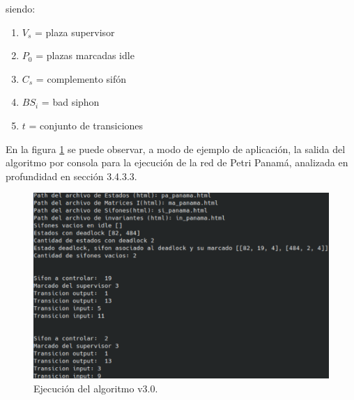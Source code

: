 \noindent siendo:
\begin{enumerate}
    \item $V_s$ = plaza supervisor
    \item $P_0$ = plazas marcadas idle
    \item $C_s$ = complemento sifón
    \item $BS_i$ = bad siphon
    \item $t$ = conjunto de transiciones
\end{enumerate}

En la figura \ref{fig:fig3.9} se puede observar, a modo de ejemplo de aplicación, la salida del algoritmo por consola para la ejecución de la red de Petri Panamá, analizada en profundidad en sección 3.4.3.3.

\begin{figure}[H]
	\centering
	\includegraphics[scale=0.5]{Figures/algoritmo3/desarrollo/consola.png}
	\caption{Ejecución del algoritmo v3.0.}
	\label{fig:fig3.9}
 \end{figure}

